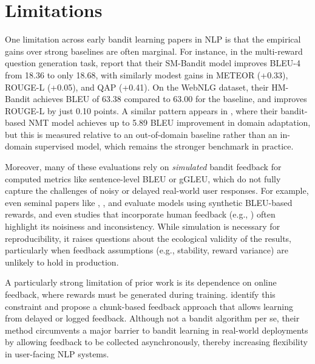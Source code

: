\documentclass[11pt]{article}
\begin{document}
\section{Limitations}

One limitation across early bandit learning papers in NLP is that the empirical gains over strong baselines are often marginal. For instance, in the multi-reward question generation task, \citet{pasunuru-etal-2020-dorb} report that their SM-Bandit model improves BLEU-4 from 18.36 to only 18.68, with similarly modest gains in METEOR (+0.33), ROUGE-L (+0.05), and QAP (+0.41). On the WebNLG dataset, their HM-Bandit achieves BLEU of 63.38 compared to 63.00 for the baseline, and improves ROUGE-L by just 0.10 points. A similar pattern appears in \citet{kreutzer-etal-2017-bandit}, where their bandit-based NMT model achieves up to 5.89 BLEU improvement in domain adaptation, but this is measured relative to an out-of-domain baseline rather than an in-domain supervised model, which remains the stronger benchmark in practice.

Moreover, many of these evaluations rely on \textit{simulated} bandit feedback for computed metrics like sentence-level BLEU or gGLEU, which do not fully capture the challenges of noisy or delayed real-world user responses. For example, even seminal papers like \citet{sokolov-etal-2016-learning}, \citet{kreutzer-etal-2017-bandit}, and \citet{kreutzer-etal-2018-reliability} evaluate models using synthetic BLEU-based rewards, and even studies that incorporate human feedback (e.g., \citet{kreutzer-etal-2018-neural}) often highlight its noisiness and inconsistency. While simulation is necessary for reproducibility, it raises questions about the ecological validity of the results, particularly when feedback assumptions (e.g., stability, reward variance) are unlikely to hold in production.

A particularly strong limitation of prior work is its dependence on online feedback, where rewards must be generated during training. \citet{petrushkov-etal-2018-learning} identify this constraint and propose a chunk-based feedback approach that allows learning from delayed or logged feedback. Although not a bandit algorithm per se, their method circumvents a major barrier to bandit learning in real-world deployments by allowing feedback to be collected asynchronously, thereby increasing flexibility in user-facing NLP systems.
\end{document}
